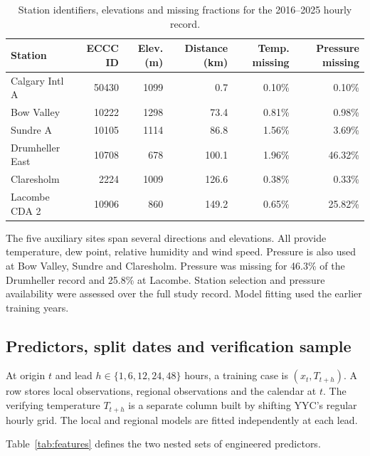 \documentclass[11pt,letterpaper]{article}
\newcommand{\thead}[1]{\textbf{#1}}\newcommand{\bestscore}[1]{\textbf{#1}}
\begin{document}
\begin{table}[!htbp]
\centering\small
\caption{Station identifiers, elevations and missing fractions for the 2016--2025 hourly record.}\label{tab:stations}
\renewcommand{\arraystretch}{1.08}\begin{tabular*}{.98\linewidth}{@{\extracolsep{\fill}}lrrrrr@{}}\toprule
\thead{Station} & \thead{ECCC ID} & \thead{Elev. (m)} & \thead{Distance (km)} & \thead{Temp. missing} & \thead{Pressure missing}\\\midrule
Calgary Intl A & 50430 & 1099 & 0.7 & 0.10\% & 0.10\% \\
Bow Valley & 10222 & 1298 & 73.4 & 0.81\% & 0.98\% \\
Sundre A & 10105 & 1114 & 86.8 & 1.56\% & 3.69\% \\
Drumheller East & 10708 & 678 & 100.1 & 1.96\% & 46.32\% \\
Claresholm & 2224 & 1009 & 126.6 & 0.38\% & 0.33\% \\
Lacombe CDA 2 & 10906 & 860 & 149.2 & 0.65\% & 25.82\% \\
\bottomrule\end{tabular*}
\end{table}


The five auxiliary sites span several directions and elevations. All provide temperature, dew point, relative humidity and wind speed. Pressure is also used at Bow Valley, Sundre and Claresholm. Pressure was missing for 46.3\% of the Drumheller record and 25.8\% at Lacombe. Station selection and pressure availability were assessed over the full study record. Model fitting used the earlier training years.


\subsection{Predictors, split dates and verification sample}\label{design}
At origin $t$ and lead $h\in\{1,6,12,24,48\}$ hours, a training case is $(x_t,T_{t+h})$. A row stores local observations, regional observations and the calendar at $t$. The verifying temperature $T_{t+h}$ is a separate column built by shifting YYC's regular hourly grid. The local and regional models are fitted independently at each lead.

Table~\ref{tab:features} defines the two nested sets of engineered predictors.
\end{document}
